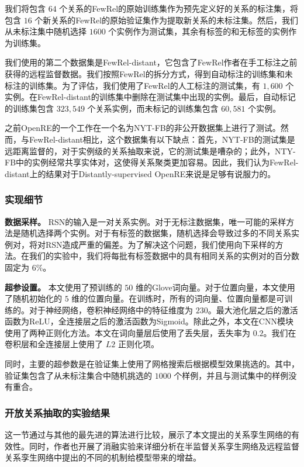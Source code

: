\begin{translation}
我们将包含 $64$ 个关系的FewRel的原始训练集作为预先定义好的关系的标注集，将包含 $16$ 个新关系的FewRel的原始验证集作为提取新关系的未标注集。然后，我们从未标注集中随机选择 $1600$ 个实例作为测试集，其余有标签的和无标签的实例作为训练集。

我们使用的第二个数据集是FewRel-distant，它包含了FewRel作者在手工标注之前获得的远程监督数据。我们按照FewRel的拆分方式，得到自动标注的训练集和未标注的训练集。为了评估，我们使用了FewRel的人工标注的测试集，有 $1,600$ 个实例。在FewRel-distant的训练集中删除在测试集中出现的实例。最后，自动标记的训练集包含 $323,549$ 个关系实例，而未标记的训练集包含 $60,581$ 个实例。

之前OpenRE的一个工作在一个名为NYT-FB的非公开数据集上进行了测试。然而，与FewRel-distant相比，这个数据集有以下缺点：首先，NYT-FB的测试集是远距离监督的，对于实例级的关系抽取来说，它的测试集是嘈杂的；此外，NTY-FB中的实例经常共享实体对，这使得关系聚类更加容易。因此，我们认为FewRel-distant上的结果对于Distantly-supervised OpenRE来说是足够有说服力的。

\subsubsection{实现细节}
\textbf{数据采样。} RSN的输入是一对关系实例。对于无标注数据集，唯一可能的采样方法是随机选择两个实例。对于有标签的数据集，随机选择会导致过多的不同关系实例对，将对RSN造成严重的偏差。为了解决这个问题，我们使用向下采样的方法。在我们的实验中，我们将每批有标签数据中的具有相同关系的实例对的百分数固定为 $6\%$。

\textbf{超参设置。} 本文使用了预训练的 $50$ 维的Glove词向量。对于位置向量，本文使用了随机初始化的 $5$ 维的位置向量。在训练时，所有的词向量、位置向量都是可训练的。对于神经网络，卷积神经网络中的特征维度为 $230$。最大池化层之后的激活函数为ReLU，全连接层之后的激活函数为Sigmoid。除此之外，本文在CNN模块使用了两种正则化方法。本文在词向量层后使用了丢失层，丢失率为 $0.2$。我们在卷积层和全连接层上使用了 $L2$ 正则化项。

同时，主要的超参数是在验证集上使用了网格搜索后根据模型效果挑选的。其中，验证集包含了从未标注集合中随机挑选的 $1000$ 个样例，并且与测试集中的样例没有重合。

\subsubsection{开放关系抽取的实验结果}
这一节通过与其他的最先进的算法进行比较，展示了本文提出的关系孪生网络的有效性。同时，作者也开展了消融实验来详细分析在半监督关系孪生网络及远程监督关系孪生网络中提出的不同的机制给模型带来的增益。


\end{translation}
